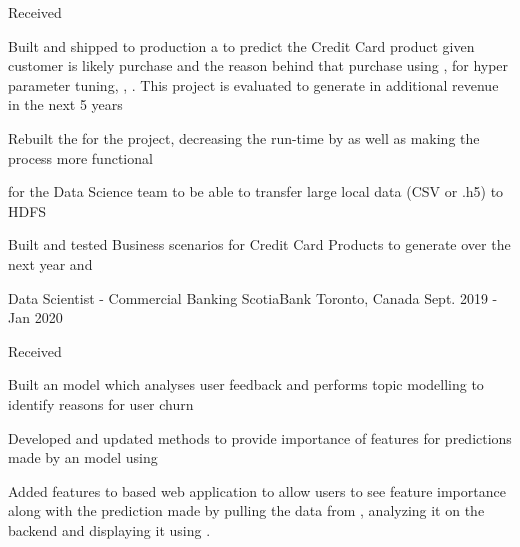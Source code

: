 \begin{cventries}
{\begin{cvitems}
        \item {Received }
        \item {Built and shipped to production a  to predict the Credit Card product given customer is likely purchase and the reason behind that purchase using ,  for hyper parameter tuning, , . This project is evaluated to generate  in additional revenue in the next 5 years}
        \item {Rebuilt the  for the project, decreasing the run-time by  as well as making the process more functional}
        \item{ for the Data Science team to be able to transfer large local data (CSV or .h5) to HDFS}
        \item {Built and tested Business scenarios for Credit Card Products to generate  over the next year and }
      \end{cvitems}
    }

  \cventry
    {Data Scientist - Commercial Banking} %
    {ScotiaBank} %
    {Toronto, Canada} %
    {Sept. 2019 - Jan 2020} %
    {
      \begin{cvitems} %
        \item {Received }
        \item {Built an  model which analyses user feedback and performs topic modelling to identify reasons for user churn}
        \item {Developed and updated methods to provide importance of features for predictions made by an  model using }
        \item {Added features to  based web application to allow users to see feature importance along with the prediction made by pulling the data from , analyzing it on the  backend and displaying it using .}
      \end{cvitems}
    }


\end{cventries}
